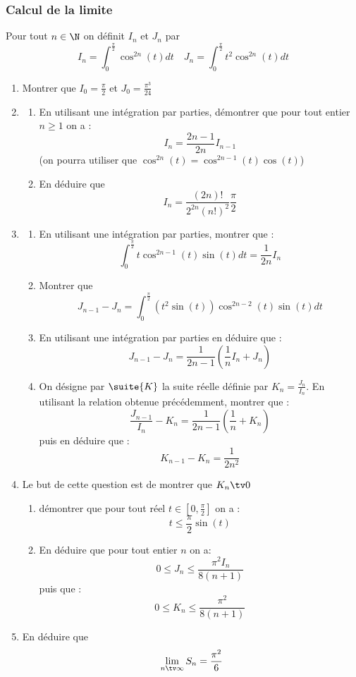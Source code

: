 \subsubsection{Calcul de la limite}
Pour tout $n\in \N$ on définit $I_n$ et $J_n$ par 
$$I_n = \int_0^{\frac{\pi}{2}} \cos^{2n}(t) dt \quad J_n=\int_0^{\frac{\pi}{2}} t^2 \cos^{2n}(t) dt$$
\begin{enumerate}
\item Montrer que $I_0= \frac{\pi}{2}$ et $J_0 = \frac{\pi^3}{24}$
\item \begin{enumerate}
\item En utilisant une intégration par parties, démontrer que pour tout entier $n\geq 1$ on a :
$$I_n =\frac{2n-1}{2n} I_{n-1}$$
(on pourra utiliser que $\cos^{2n}(t)=\cos^{2n-1}(t)\cos(t)$)
\item En déduire que 
$$I_n = \frac{(2n)! }{2^{2n} (n!)^2} \frac{\pi}{2}$$
\end{enumerate}
\item \begin{enumerate}
\item En utilisant une intégration par parties, montrer que : 
$$\int_0^{\frac{\pi}{2}} t \cos^{2n-1}(t)\sin(t) dt =\frac{1}{2n} I_n$$
\item Montrer que $$J_{n-1} -J_n = \int_0^{\frac{\pi}{2}}( t^2 \sin(t)) \cos^{2n-2}(t)\sin(t) dt$$
\item En utilisant une intégration par parties en déduire que :
$$J_{n-1} -J_n = \frac{1}{2n-1}\left( \frac{1}{n}I_n +J_n\right)$$
\item On désigne par $\suite{K}$ la suite réelle définie par $K_n = \frac{J_n}{I_n}$. 
En utilisant la relation obtenue précédemment, montrer que :
$$\frac{J_{n-1}}{I_n} -K_n = \frac{1}{2n-1}\left( \frac{1}{n} +K_n\right)$$
puis en déduire que :
$$K_{n-1} - K_n =\frac{1}{2n^2}$$
\end{enumerate}
\item Le but de cette question est de montrer que $K_n \tv 0$ 
\begin{enumerate}
\item démontrer que pour tout réel $t\in [0, \frac{\pi}{2}] $ on a :
$$t\leq \frac{\pi}{2 }\sin(t)$$
\item  En déduire que pour tout entier $n$ on  a: 
$$0\leq J_n \leq \frac{\pi^2 I_n}{8(n+1) }$$
puis que : 
$$0\leq K_n \leq \frac{\pi^2 }{8(n+1) }$$
\end{enumerate}
\item En déduire que $$\lim_{n\tv \infty} S_n =\frac{\pi^2}{6}$$
\end{enumerate}


